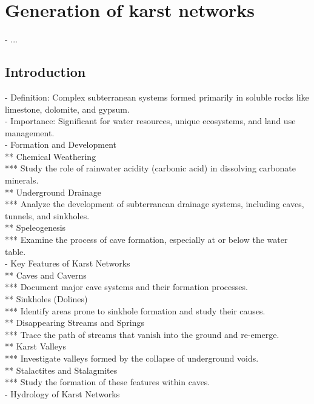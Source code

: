 \graphicspath{{"./Chapter 2/Figures/"}}

\chapter{Generation of karst networks}
\label{chap:karsts}
\minitoc

- ...

\section{Introduction}
\label{sec:karst_introduction}
- Definition: Complex subterranean systems formed primarily in soluble rocks like limestone, dolomite, and gypsum. \\
- Importance: Significant for water resources, unique ecosystems, and land use management. \\
- Formation and Development \\
** Chemical Weathering \\
*** Study the role of rainwater acidity (carbonic acid) in dissolving carbonate minerals. \\
** Underground Drainage \\
*** Analyze the development of subterranean drainage systems, including caves, tunnels, and sinkholes. \\
** Speleogenesis \\
*** Examine the process of cave formation, especially at or below the water table. \\
- Key Features of Karst Networks \\
** Caves and Caverns \\
*** Document major cave systems and their formation processes. \\
** Sinkholes (Dolines) \\
*** Identify areas prone to sinkhole formation and study their causes. \\
** Disappearing Streams and Springs \\
*** Trace the path of streams that vanish into the ground and re-emerge. \\
** Karst Valleys \\
*** Investigate valleys formed by the collapse of underground voids. \\
** Stalactites and Stalagmites \\
*** Study the formation of these features within caves. \\
- Hydrology of Karst Networks \\
